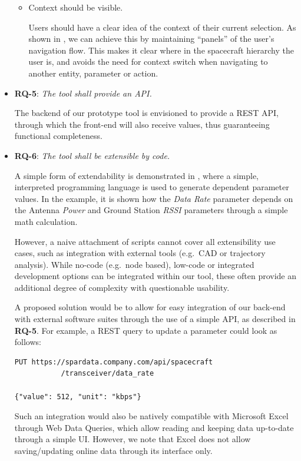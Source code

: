 \documentclass[]{iac}
\begin{document}
\begin{itemize}[itemsep=6pt]
\begin{itemize}
        \item Context should be visible.

        Users should have a clear idea of the context of their current selection. As shown in , we can achieve this by maintaining ``panels'' of the user's navigation flow. This makes it clear where in
        the spacecraft hierarchy the user is, and avoids the need for context switch when navigating to another entity, parameter or action.
    \end{itemize}

    \item \textbf{RQ-5}: \emph{The tool shall provide an \acf{API}.}

    The backend of our prototype tool is envisioned to provide a \ac{REST} \ac{API}, through which the front-end will also receive values, thus guaranteeing functional completeness.


    \item \textbf{RQ-6}: \emph{The tool shall be extensible by code.}

    A simple form of extendability is demonstrated in , where a simple, interpreted programming language is used to generate dependent parameter values. In the example, it is shown how the \emph{Data Rate} parameter depends on the Antenna \emph{Power} and Ground Station \emph{\acs{RSSI}} parameters through a simple math calculation.

    However, a naive attachment of scripts cannot cover all extensibility use cases, such as integration with external tools (e.g.~CAD or trajectory analysis). While no-code (e.g.~node based), low-code or integrated development options can be integrated within our tool, these often provide an additional degree of complexity with questionable usability.

    A proposed solution would be to allow for easy integration of our back-end with external software suites through the use of a simple \ac{API}, as described in \textbf{RQ-5}. For example, a \acs{REST} query to update a parameter could look as follows:
    \begin{verbatim}
PUT https://spardata.company.com/api/spacecraft
           /transceiver/data_rate

{"value": 512, "unit": "kbps"}
\end{verbatim}

    Such an integration would also be natively compatible with Microsoft Excel through Web Data Queries, which allow reading and keeping data up-to-date through a simple \ac{UI}. However, we note that Excel does not allow saving/updating online data through its interface only.


\end{itemize}
\end{document}
